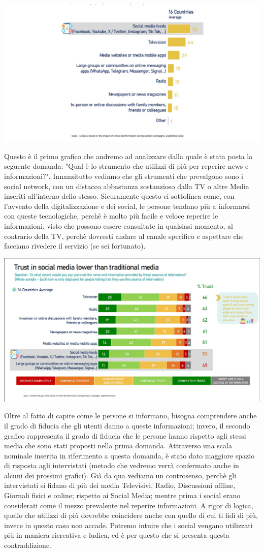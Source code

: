 \documentclass{article}
\begin{document}
\centering\includegraphics[width=0.5\linewidth]{Immagini/Grafico1.jpg}\\
    \begin{justify}
    Questo è il primo grafico che andremo ad analizzare dalla quale è stata posta la seguente domanda: "Qual è lo strumento che utilizzi di più per reperire news e informazioni?".
    Innanzitutto vediamo che gli strumenti che prevalgono sono i social network, con un distacco abbastanza sostanzioso dalla TV o altre Media inseriti all'interno dello stesso. Sicuramente questo ci sottolinea come, con l'avvento della digitalizzazione e dei social, le persone tendano più a informarsi con queste tecnologiche, perchè è molto più facile e veloce reperire le informazioni, visto che possono essere consultate in qualsiasi momento, al contrario della TV, perchè dovresti andare al canale specifico e aspettare che facciano rivedere il servizio (se sei fortunato).
    
\begin{center}
\includegraphics[width=0.5\linewidth]{Immagini/Grafico2.jpg}\\
\end{center}

    Oltre al fatto di capire come le persone si informano, bisogna comprendere anche il grado di fiducia che gli utenti danno a queste informazioni; invero, il secondo grafico rappresenta il grado di fiducia che le persone hanno rispetto agli stessi media che sono stati proposti nella prima domanda.
    Attraverso una scala nominale inserita in riferimento a questa domanda, è stato dato maggiore spazio di risposta agli intervistati (metodo che vedremo verrà confermato anche in alcuni dei prossimi grafici).
    Già da qua vediamo un controsenso, perchè gli intervistati si fidano di più dei media Televisivi, Radio, Discussioni offline, Giornali fisici e online; rispetto ai Social Media; mentre prima i social erano considerati come il mezzo prevalente nel reperire informazioni. A rigor di logica, quello che utilizzi di più dovrebbe coincidere anche con quello di cui ti fidi di più, invece in questo caso non accade. Potremo intuire che i social vengano utilizzati più in maniera ricreativa e ludica, ed è per questo che si presenta questa contraddizione.
    

\end{justify}
\end{document}
